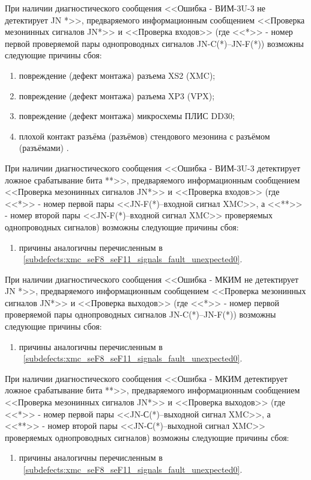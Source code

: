     \subpoint При наличии диагностического сообщения <<Ошибка - ВИМ-3U-3 не детектирует JN *>>, 
	      предваряемого информационным сообщением <<Проверка мезонинных сигналов JN*>> и <<Проверка входов>>
	      (где <<*>> - номер первой проверяемой пары однопроводных сигналов JN-C(*)--JN-F(*)) возможны следующие причины сбоя:
      \label{subdefects:xmc_seF8_seF11_signals_fault_unexpected0}
      \begin{enumerate}
	\item повреждение (дефект монтажа) разъема XS2 (XMC);
	\item повреждение (дефект монтажа) разъема XP3 (VPX);
	\item повреждение (дефект монтажа) микросхемы ПЛИС DD30;
	\item плохой контакт разъёма (разъёмов) стендового мезонина с разъёмом (разъёмами) \DocProductShortTitle.
      \end{enumerate}
	      
    \subpoint При наличии диагностического сообщения <<Ошибка - ВИМ-3U-3 детектирует ложное срабатывание бита **>>,
	      предваряемого информационным сообщением <<Проверка мезонинных сигналов JN*>> и <<Проверка входов>>
	      (где <<*>> - номер первой пары <<JN-F(*)--входной сигнал XMC>>, а  <<**>> - номер второй пары <<JN-F(*)--входной сигнал XMC>> проверяемых однопроводных сигналов) возможны следующие причины сбоя:
      \begin{enumerate}
	\item причины аналогичны перечисленным в ~\ref{subdefects:xmc_seF8_seF11_signals_fault_unexpected0}.
      \end{enumerate}
      
    \subpoint При наличии диагностического сообщения <<Ошибка - МКИМ не детектирует JN *>>,
	      предваряемого информационным сообщением <<Проверка мезонинных сигналов JN*>> и <<Проверка выходов>>
	      (где <<*>> - номер первой проверяемой пары однопроводных сигналов JN-C(*)--JN-F(*)) возможны следующие причины сбоя:
      \begin{enumerate}
	\item причины аналогичны перечисленным в ~\ref{subdefects:xmc_seF8_seF11_signals_fault_unexpected0}.
      \end{enumerate}
      
    \subpoint При наличии диагностического сообщения <<Ошибка - МКИМ детектирует ложное срабатывание бита **>>, 
	      предваряемого информационным сообщением <<Проверка мезонинных сигналов JN*>> и <<Проверка выходов>>
	      (где <<*>> - номер первой пары <<JN-С(*)--выходной сигнал XMC>>, а  <<**>> - номер второй пары <<JN-С(*)--выходной сигнал XMC>> проверяемых однопроводных сигналов) возможны следующие причины сбоя:
      \begin{enumerate}
	\item причины аналогичны перечисленным в ~\ref{subdefects:xmc_seF8_seF11_signals_fault_unexpected0}.
      \end{enumerate}
      
